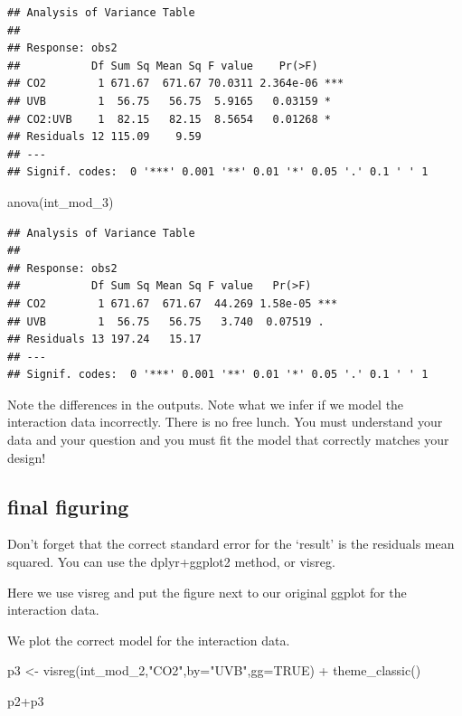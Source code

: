 \documentclass[
]{book}
\newenvironment{Shaded}{\begin{snugshade}}{\end{snugshade}}
\newcommand{\AttributeTok}[1]{\textcolor[rgb]{0.77,0.63,0.00}{#1}}
\newcommand{\ConstantTok}[1]{\textcolor[rgb]{0.00,0.00,0.00}{#1}}
\newcommand{\FunctionTok}[1]{\textcolor[rgb]{0.00,0.00,0.00}{#1}}
\newcommand{\NormalTok}[1]{#1}
\newcommand{\OtherTok}[1]{\textcolor[rgb]{0.56,0.35,0.01}{#1}}
\newcommand{\SpecialCharTok}[1]{\textcolor[rgb]{0.00,0.00,0.00}{#1}}
\newcommand{\StringTok}[1]{\textcolor[rgb]{0.31,0.60,0.02}{#1}}
\begin{document}
\begin{verbatim}
## Analysis of Variance Table
## 
## Response: obs2
##           Df Sum Sq Mean Sq F value    Pr(>F)    
## CO2        1 671.67  671.67 70.0311 2.364e-06 ***
## UVB        1  56.75   56.75  5.9165   0.03159 *  
## CO2:UVB    1  82.15   82.15  8.5654   0.01268 *  
## Residuals 12 115.09    9.59                      
## ---
## Signif. codes:  0 '***' 0.001 '**' 0.01 '*' 0.05 '.' 0.1 ' ' 1
\end{verbatim}

\begin{Shaded}
\begin{Highlighting}[]
\FunctionTok{anova}\NormalTok{(int\_mod\_3)}
\end{Highlighting}
\end{Shaded}

\begin{verbatim}
## Analysis of Variance Table
## 
## Response: obs2
##           Df Sum Sq Mean Sq F value   Pr(>F)    
## CO2        1 671.67  671.67  44.269 1.58e-05 ***
## UVB        1  56.75   56.75   3.740  0.07519 .  
## Residuals 13 197.24   15.17                     
## ---
## Signif. codes:  0 '***' 0.001 '**' 0.01 '*' 0.05 '.' 0.1 ' ' 1
\end{verbatim}

Note the differences in the outputs. Note what we infer if we model the interaction data incorrectly. There is no free lunch. You must understand your data and your question and you must fit the model that correctly matches your design!

\hypertarget{final-figuring}{%
\subsection{final figuring}\label{final-figuring}}

Don't forget that the correct standard error for the `result' is the residuals mean squared. You can use the dplyr+ggplot2 method, or visreg.

Here we use visreg and put the figure next to our original ggplot for the interaction data.

We plot the correct model for the interaction data.

\begin{Shaded}
\begin{Highlighting}[]
\NormalTok{p3 }\OtherTok{\textless{}{-}} \FunctionTok{visreg}\NormalTok{(int\_mod\_2,}\StringTok{"CO2"}\NormalTok{,}\AttributeTok{by=}\StringTok{"UVB"}\NormalTok{,}\AttributeTok{gg=}\ConstantTok{TRUE}\NormalTok{) }\SpecialCharTok{+}
  \FunctionTok{theme\_classic}\NormalTok{()}

\NormalTok{p2}\SpecialCharTok{+}\NormalTok{p3}
\end{Highlighting}
\end{Shaded}
\end{document}
